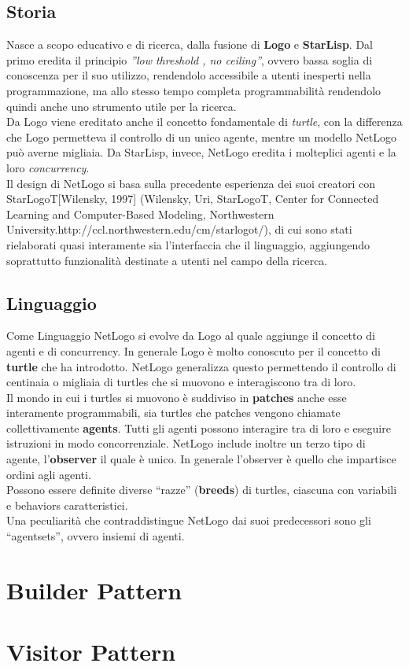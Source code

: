 \subsection{Storia}
Nasce a scopo educativo e di ricerca, dalla fusione di \textbf{Logo} e \textbf{StarLisp}. Dal primo eredita il principio \textit{”low threshold , no ceiling”}, ovvero bassa soglia di conoscenza per il suo utilizzo, rendendolo accessibile a utenti inesperti nella programmazione, ma allo stesso tempo completa programmabilità rendendolo quindi anche uno strumento utile per la ricerca.\\
Da Logo viene ereditato anche il concetto fondamentale di \textit{turtle}, con la differenza che Logo permetteva il controllo di un unico agente, mentre un modello NetLogo può averne migliaia. Da StarLisp, invece, NetLogo eredita i molteplici agenti e la loro \textit{concurrency}.\\
Il design di NetLogo si basa sulla precedente esperienza dei suoi creatori con StarLogoT[Wilensky, 1997] (Wilensky, Uri, StarLogoT, Center for Connected Learning and Computer-Based Modeling, Northwestern University.http://ccl.northwestern.edu/cm/starlogot/), di cui sono stati rielaborati quasi interamente sia l'interfaccia che il linguaggio, aggiungendo soprattutto funzionalità destinate a utenti nel campo della ricerca.

\subsection{Linguaggio}
Come Linguaggio NetLogo si evolve da Logo al quale aggiunge il concetto di agenti e di concurrency. In generale Logo è molto conoscuto per il concetto di \textbf{turtle} che ha introdotto. NetLogo generalizza questo permettendo il controllo di centinaia o migliaia di turtles che si muovono e interagiscono tra di loro.\\
Il mondo in cui i turtles si muovono è suddiviso in \textbf{patches} anche esse interamente programmabili, sia turtles che patches vengono chiamate collettivamente \textbf{agents}. Tutti gli agenti possono interagire tra di loro e eseguire istruzioni in modo concorrenziale. NetLogo include inoltre un terzo tipo di agente, l'\textbf{observer} il quale è unico. In generale l'observer è quello che impartisce ordini agli agenti.\\
Possono essere definite diverse “razze” (\textbf{breeds}) di turtles, ciascuna con variabili e behaviors caratteristici.\\
Una peculiarità che contraddistingue NetLogo dai suoi predecessori sono gli “agentsets”, ovvero insiemi di agenti.

\section{Builder Pattern}
\label{sec:builder}


\section{Visitor Pattern}
\label{sec:visitor}


 
